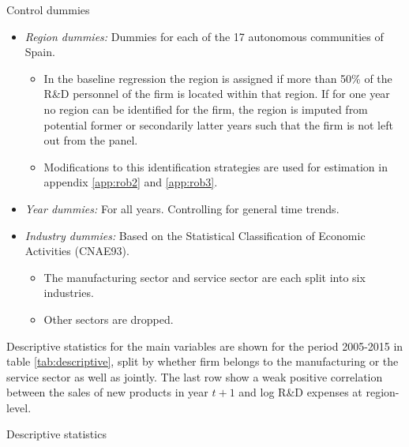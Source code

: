 \noindent
Control dummies
\begin{itemize}
  \item \textit{Region dummies:} Dummies for each of the 17 autonomous communities of Spain.
  \begin{itemize}
    \item In the baseline regression the region is assigned if more than 50\% of the R\&D personnel of the firm is located within that region. If for one year no region can be identified for the firm, the region is imputed from potential former or secondarily latter years such that the firm is not left out from the panel.
    \item Modifications to this identification strategies are used for estimation in appendix \ref{app:rob2} and \ref{app:rob3}.
  \end{itemize}
  \item \textit{Year dummies:} For all years. Controlling for general time trends.
  \item \textit{Industry dummies:}	Based on the Statistical Classification of Economic Activities (CNAE93).
  \begin{itemize}
    \item The manufacturing sector and service sector are each split into six industries.
    \item Other sectors are dropped.
  \end{itemize}
\end{itemize}
Descriptive statistics for the main variables are shown for the period 2005-2015 in table \ref{tab:descriptive}, split by whether firm belongs to the manufacturing or the service sector as well as jointly. The last row show a weak positive correlation between the sales of new products in year $t+1$ and log R\&D expenses at region-level.
\begin{table}[H]
  \centering
  \caption{Descriptive statistics}
  \footnotesize
    
  \label{tab:descriptive}
\end{table}
